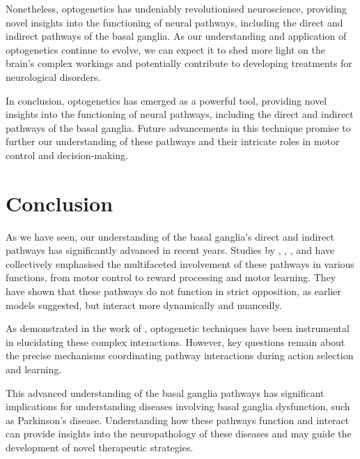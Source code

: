 \documentclass[10pt]{article}
\begin{document}
\begin{sloppypar}
  Nonetheless, optogenetics has undeniably revolutionised neuroscience, providing novel insights into the functioning of neural pathways, including the direct and indirect pathways of the basal ganglia. As our understanding and application of optogenetics continue to evolve, we can expect it to shed more light on the brain’s complex workings and potentially contribute to developing treatments for neurological disorders.

  In conclusion, optogenetics has emerged as a powerful tool, providing novel insights into the functioning of neural pathways, including the direct and indirect pathways of the basal ganglia. Future advancements in this technique promise to further our understanding of these pathways and their intricate roles in motor control and decision-making.

  \section{Conclusion}
  \label{sec:conclusion}

  As we have seen, our understanding of the basal ganglia’s direct and indirect pathways has significantly advanced in recent years. Studies by \cite{cui_concurrent_2013}, \cite{guillaumin_experimental_2021}, \cite{hilt_evidence_2016}, and \cite{wang_direct_2015} have collectively emphasised the multifaceted involvement of these pathways in various functions, from motor control to reward processing and motor learning. They have shown that these pathways do not function in strict opposition, as earlier models suggested, but interact more dynamically and nuancedly.

  As demonstrated in the work of \cite{kravitz_regulation_2010}, optogenetic techniques have been instrumental in elucidating these complex interactions. However, key questions remain about the precise mechanisms coordinating pathway interactions during action selection and learning.

  This advanced understanding of the basal ganglia pathways has significant implications for understanding diseases involving basal ganglia dysfunction, such as Parkinson’s disease. Understanding how these pathways function and interact can provide insights into the neuropathology of these diseases and may guide the development of novel therapeutic strategies.


\end{sloppypar}
\end{document}
